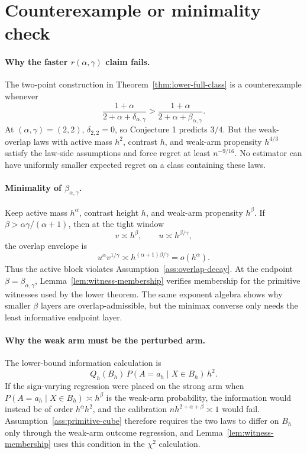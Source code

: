 \documentclass[11pt]{article}
\theoremstyle{definition}
\theoremstyle{plain}
\theoremstyle{remark}
\begin{document}
\section{Counterexample or minimality check}
\paragraph{Why the faster \(r(\alpha,\gamma)\) claim fails.}
The two-point construction in Theorem~\ref{thm:lower-full-class} is a
counterexample whenever
\[
\frac{1+\alpha}{2+\alpha+\delta_{\alpha,\gamma}}
>
\frac{1+\alpha}{2+\alpha+\beta_{\alpha,\gamma}}.
\]
At \((\alpha,\gamma)=(2,2)\), \(\delta_{2,2}=0\), so Conjecture 1 predicts
\(3/4\).  But the weak-overlap laws with active mass \(h^2\), contrast
\(h\), and weak-arm propensity \(h^{4/3}\) satisfy the law-side assumptions
and force regret at least \(n^{-9/16}\).  No estimator can have uniformly
smaller expected regret on a class containing these laws.

\paragraph{Minimality of \(\beta_{\alpha,\gamma}\).}
Keep active mass \(h^\alpha\), contrast height \(h\), and weak-arm propensity
\(h^\beta\).  If \(\beta>\alpha\gamma/(\alpha+1)\), then at the tight window
\[
v\asymp h^\beta,\qquad u\asymp h^{\beta/\gamma},
\]
the overlap envelope is
\[
u^\alpha v^{1/\gamma}
\asymp h^{(\alpha+1)\beta/\gamma}
=o(h^\alpha).
\]
Thus the active block violates Assumption~\ref{ass:overlap-decay}.  At the
endpoint \(\beta=\beta_{\alpha,\gamma}\),
Lemma~\ref{lem:witness-membership} verifies membership for the primitive
witnesses used by the lower theorem.  The same exponent algebra shows why
smaller \(\beta\) layers are overlap-admissible, but the minimax converse only
needs the least informative endpoint layer.

\paragraph{Why the weak arm must be the perturbed arm.}
The lower-bound information calculation is
\[
Q_h(B_h)\,P(A=a_h\mid X\in B_h)\,h^2.
\]
If the sign-varying regression were placed on the strong arm when
\(P(A=a_h\mid X\in B_h)\asymp h^\beta\) is the weak-arm probability, the
information would instead be of order \(h^\alpha h^2\), and the calibration
\(n h^{2+\alpha+\beta}\asymp1\) would fail.  Assumption~\ref{ass:primitive-cube}
therefore requires the two laws to differ on \(B_h\) only through the
weak-arm outcome regression, and Lemma~\ref{lem:witness-membership} uses this
condition in the \(\chi^2\) calculation.
\end{document}
